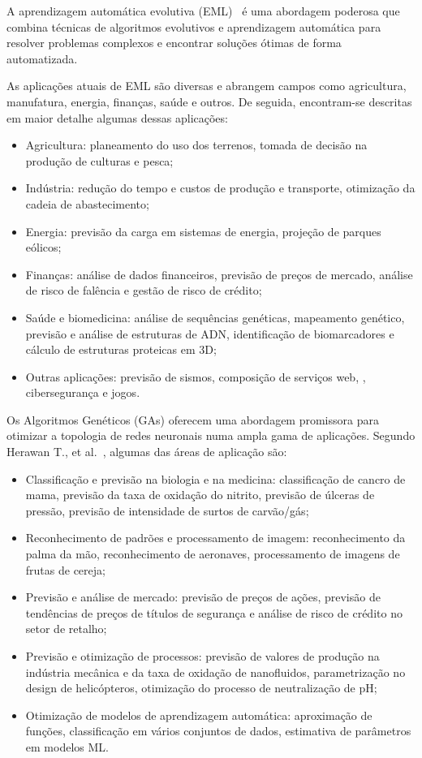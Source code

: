 A aprendizagem automática evolutiva (EML)~\cite{Al-Sahaf2019ALearning} é uma abordagem poderosa que combina técnicas de algoritmos evolutivos e aprendizagem automática para resolver problemas complexos e encontrar soluções ótimas de forma automatizada.

As aplicações atuais de EML são diversas e abrangem campos como agricultura, manufatura, energia, finanças, saúde e outros.
De seguida, encontram-se descritas em maior detalhe algumas dessas aplicações:
\begin{itemize}
    \item Agricultura: planeamento do uso dos terrenos, tomada de decisão na produção de culturas e pesca;
    \item Indústria: redução do tempo e custos de produção e transporte, otimização da cadeia de abastecimento;
    \item Energia: previsão da carga em sistemas de energia, projeção de parques eólicos;
    \item Finanças: análise de dados financeiros, previsão de preços de mercado, análise de risco de falência e gestão de risco de crédito;
    \item Saúde e biomedicina: análise de sequências genéticas, mapeamento genético, previsão e análise de estruturas de ADN, identificação de biomarcadores e cálculo de estruturas proteicas em 3D;
    \item Outras aplicações: previsão de sismos, composição de serviços web, , cibersegurança e jogos.
\end{itemize}

Os Algoritmos Genéticos (GAs) oferecem uma abordagem promissora para otimizar a topologia de redes neuronais numa ampla gama de aplicações.
Segundo Herawan T., et al.~\cite{Chiroma2017NeuralReview}, algumas das áreas de aplicação são:
\begin{itemize}
    \item Classificação e previsão na biologia e na medicina: classificação de cancro de mama, previsão da taxa de oxidação do nitrito, previsão de úlceras de pressão, previsão de intensidade de surtos de carvão/gás;
    \item Reconhecimento de padrões e processamento de imagem: reconhecimento da palma da mão, reconhecimento de aeronaves, processamento de imagens de frutas de cereja;
    \item Previsão e análise de mercado: previsão de preços de ações, previsão de tendências de preços de títulos de segurança e análise de risco de crédito no setor de retalho;
    \item Previsão e otimização de processos: previsão de valores de produção na indústria mecânica e da taxa de oxidação de nanofluidos, parametrização no design de helicópteros, otimização do processo de neutralização de pH;
    \item Otimização de modelos de aprendizagem automática: aproximação de funções, classificação em vários conjuntos de dados, estimativa de parâmetros em modelos ML\@.
\end{itemize}

